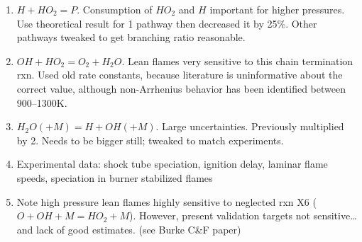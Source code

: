 \documentclass[preprint,3p,times,twocolumn]{elsarticle}
\begin{document}
\begin{description}
\begin{enumerate}
                    \item $H+HO_2 = P$. Consumption of $HO_2$ and $H$ important
                        for higher pressures. Use theoretical result for 1
                        pathway then decreased it by 25\%. Other pathways
                        tweaked to get branching ratio reasonable. 
                    \item $OH + HO_2 = O_2 + H_2O$. Lean flames very sensitive
                        to this chain termination rxn. Used old rate constants,
                        because literature is uninformative about the correct
                        value, although non-Arrhenius behavior has been
                        identified between 900--1300K.
                    \item $H_2O (+M) = H + OH (+M)$. Large uncertainties.
                        Previously multiplied by 2. Needs to be bigger still;
                        tweaked to match experiments. 
                    \item Experimental data: shock tube speciation, ignition delay, laminar flame speeds, speciation in burner stabilized flames
                    \item Note high pressure lean flames highly sensitive to
                        neglected rxn X6 ($O + OH + M = HO_2 + M$). However,
                        present validation targets not sensitive\ldots and lack
                        of good estimates. (see Burke C\&F paper)
                \end{enumerate}


\end{description}
\end{document}
